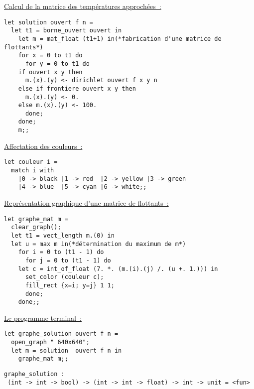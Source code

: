 \uline{Calcul de la matrice des températures approchées~:}
{\begin{verbatim}
let solution ouvert f n =
  let t1 = borne_ouvert ouvert in
    let m = mat_float (t1+1) in(*fabrication d'une matrice de flottants*)
    for x = 0 to t1 do
      for y = 0 to t1 do
	if ouvert x y then
	  m.(x).(y) <- dirichlet ouvert f x y n
	else if frontiere ouvert x y then
	  m.(x).(y) <- 0.
	else m.(x).(y) <- 100.
      done;
    done;
    m;;
\end{verbatim}}

\uline{Affectation des couleurs~:}\par
{\begin{verbatim}
let couleur i =
  match i with
    |0 -> black |1 -> red  |2 -> yellow |3 -> green
    |4 -> blue  |5 -> cyan |6 -> white;;
\end{verbatim}}

\uline{Représentation graphique d'une matrice de flottants~:}\par
{\begin{verbatim}
let graphe_mat m =
  clear_graph();
  let t1 = vect_length m.(0) in
  let u = max m in(*détermination du maximum de m*)
    for i = 0 to (t1 - 1) do
      for j = 0 to (t1 - 1) do
	let c = int_of_float (7. *. (m.(i).(j) /. (u +. 1.))) in
	  set_color (couleur c);
	  fill_rect {x=i; y=j} 1 1;
      done;
    done;;
\end{verbatim}}

\uline{Le programme terminal~:}\par
{\begin{verbatim}
let graphe_solution ouvert f n =
  open_graph " 640x640";
  let m = solution  ouvert f n in
    graphe_mat m;;
\end{verbatim}}
{\begin{verbatim}
graphe_solution :
 (int -> int -> bool) -> (int -> int -> float) -> int -> unit = <fun>
\end{verbatim}}

